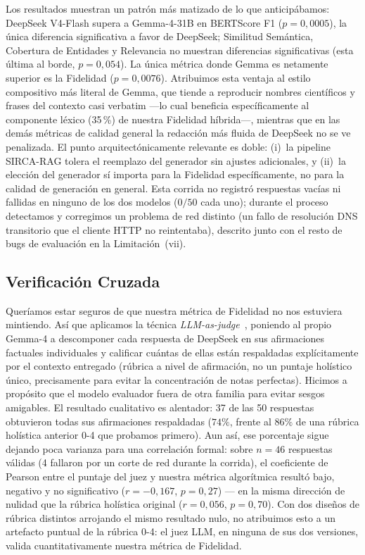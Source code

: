 \documentclass[runningheads]{llncs}
\newcommand{\sirca}{\textsc{SIRCA-RAG}}
\begin{document}
Los resultados muestran un patr\'{o}n m\'{a}s matizado de lo que anticip\'{a}bamos: DeepSeek V4-Flash supera a Gemma-4-31B en BERTScore F1 ($p{=}0{,}0005$), la \'{u}nica diferencia significativa a favor de DeepSeek; Similitud Sem\'{a}ntica, Cobertura de Entidades y Relevancia no muestran diferencias significativas (esta \'{u}ltima al borde, $p{=}0{,}054$). La \'{u}nica m\'{e}trica donde Gemma es netamente superior es la Fidelidad ($p{=}0{,}0076$). Atribuimos esta ventaja al estilo compositivo m\'{a}s literal de Gemma, que tiende a reproducir nombres cient\'{i}ficos y frases del contexto casi verbatim —lo cual beneficia espec\'{i}ficamente al componente l\'{e}xico (35\,\%) de nuestra Fidelidad h\'{i}brida—, mientras que en las dem\'{a}s m\'{e}tricas de calidad general la redacci\'{o}n m\'{a}s fluida de DeepSeek no se ve penalizada. El punto arquitect\'{o}nicamente relevante es doble: (i)~la pipeline \sirca{} tolera el reemplazo del generador sin ajustes adicionales, y (ii)~la elecci\'{o}n del generador s\'{i} importa para la Fidelidad espec\'{i}ficamente, no para la calidad de generaci\'{o}n en general. Esta corrida no registr\'{o} respuestas vac\'{i}as ni fallidas en ninguno de los dos modelos ($0/50$ cada uno); durante el proceso detectamos y corregimos un problema de red distinto (un fallo de resoluci\'{o}n DNS transitorio que el cliente HTTP no reintentaba), descrito junto con el resto de bugs de evaluaci\'{o}n en la Limitaci\'{o}n~(vii).

\subsection{Verificaci\'{o}n Cruzada}
\label{sec:llm_judge}

Quer\'{i}amos estar seguros de que nuestra m\'{e}trica de Fidelidad no nos estuviera mintiendo. As\'{i} que aplicamos la t\'{e}cnica \emph{LLM-as-judge}~\cite{zheng2023mtbench}, poniendo al propio Gemma-4 a descomponer cada respuesta de DeepSeek en sus afirmaciones factuales individuales y calificar cu\'{a}ntas de ellas est\'{a}n respaldadas expl\'{i}citamente por el contexto entregado (rúbrica a nivel de afirmaci\'{o}n, no un puntaje holístico \'{u}nico, precisamente para evitar la concentraci\'{o}n de notas perfectas). Hicimos a prop\'{o}sito que el modelo evaluador fuera de otra familia para evitar sesgos amigables. El resultado cualitativo es alentador: 37 de las 50 respuestas obtuvieron todas sus afirmaciones respaldadas ($74\%$, frente al $86\%$ de una rúbrica holística anterior 0-4 que probamos primero). Aun as\'{i}, ese porcentaje sigue dejando poca varianza para una correlaci\'{o}n formal: sobre $n{=}46$ respuestas v\'{a}lidas (4 fallaron por un corte de red durante la corrida), el coeficiente de Pearson entre el puntaje del juez y nuestra m\'{e}trica algor\'{i}tmica result\'{o} bajo, negativo y no significativo ($r{=}{-}0{,}167$, $p{=}0{,}27$) — en la misma direcci\'{o}n de nulidad que la r\'{u}brica holística original ($r{=}0{,}056$, $p{=}0{,}70$). Con dos dise\~{n}os de r\'{u}brica distintos arrojando el mismo resultado nulo, no atribuimos esto a un artefacto puntual de la r\'{u}brica 0-4: el juez LLM, en ninguna de sus dos versiones, valida cuantitativamente nuestra m\'{e}trica de Fidelidad.
\end{document}
